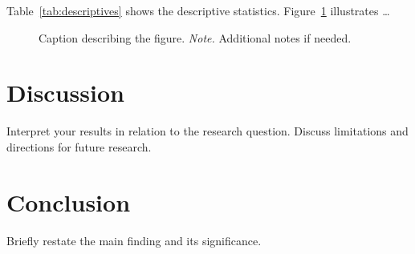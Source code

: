 \documentclass[man, 12pt, a4paper]{apa7}
\begin{document}
Table~\ref{tab:descriptives} shows the descriptive statistics.
Figure~\ref{fig:results} illustrates \ldots

\begin{figure}[htbp]
  \centering
  \caption{Caption describing the figure. \textit{Note.} Additional notes if needed.}
  \label{fig:results}
\end{figure}

\section{Discussion}

Interpret your results in relation to the research question.
Discuss limitations and directions for future research.

\section{Conclusion}

Briefly restate the main finding and its significance.

\printbibliography
\end{document}

